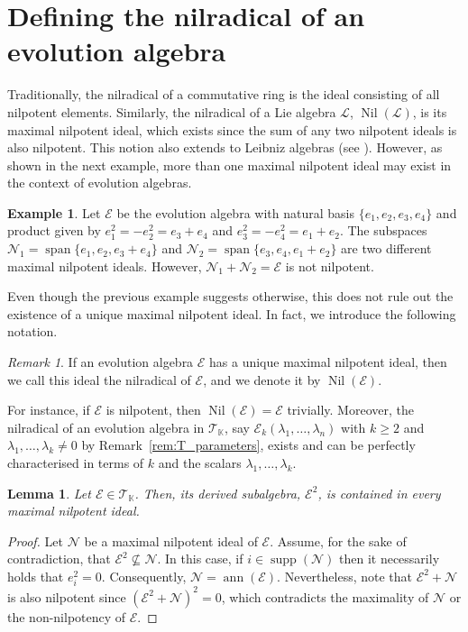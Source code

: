 \documentclass[12pt,reqno]{amsart}
\newtheorem{lemma}[theorem]{Lemma}
\theoremstyle{definition}
\newtheorem{example}[theorem]{Example}
\theoremstyle{remark}
\newtheorem{remark}[theorem]{Remark}
\DeclareMathOperator{\ann}{ann}
\DeclareMathOperator{\spa}{span}
\DeclareMathOperator{\supp}{supp}
\DeclareMathOperator{\nil}{Nil}
\numberwithin{equation}{section}
\begin{document}
\section{Defining the nilradical of an evolution algebra}\label{sec:3}

Traditionally, the nilradical of a commutative ring is the ideal consisting of all nilpotent elements. Similarly, the nilradical of a Lie algebra $\mathcal{L}$, $\nil(\mathcal{L})$, is its maximal nilpotent ideal, which exists since the sum of any two nilpotent ideals is also nilpotent. This notion also extends to Leibniz algebras (see \cite[Corollary 4]{bosko2011jacobson}). However, as shown in the next example, more than one maximal nilpotent ideal may exist in the context of evolution algebras.

\begin{example}\label{ex:1}
	Let $\mathcal{E}$ be the evolution algebra with natural basis $\{e_1,e_2,e_3,e_4\}$ and product given by $e_1^2=-e_2^2=e_3+e_4$ and $e_3^2=-e_4^2=e_1+e_2$. The subspaces $\mathcal{N}_1=\spa\{e_1,e_2,e_3+e_4\}$ and $\mathcal{N}_2=\spa\{e_3,e_4,e_1+e_2\}$ are two different maximal nilpotent ideals. However, $\mathcal{N}_1+\mathcal{N}_2=\mathcal{E}$ is not nilpotent.
\end{example}
Even though the previous example suggests otherwise, this does not rule out the existence of a unique maximal nilpotent ideal. In fact, we introduce the following notation.
\begin{remark} 
If an evolution algebra $\mathcal{E}$ has a unique maximal nilpotent ideal, then we call this ideal the nilradical of $\mathcal{E}$, and we denote it by $\nil(\mathcal{E})$.
\end{remark}
For instance, if $\mathcal{E}$ is nilpotent, then $\nil(\mathcal{E})=\mathcal{E}$ trivially. Moreover, the nilradical of an evolution algebra in $\mathcal{T}_\mathbb{K}$, say $\mathcal{E}_k(\lambda_1,\dots,\lambda_n)$ with $k\geq2$ and $\lambda_1,\dots,\lambda_k\neq0$ by Remark~\ref{rem:T_parameters}, exists and can be perfectly characterised in terms of $k$ and the scalars $\lambda_1,\dots,\lambda_k$.

\begin{lemma}\label{lem:lem1}
	Let $\mathcal{E}\in\mathcal{T}_\mathbb{K}$. Then, its derived subalgebra, $\mathcal{E}^2$, is contained in every maximal nilpotent ideal.
\end{lemma}

\begin{proof}
	Let $\mathcal{N}$ be a maximal nilpotent ideal of $\mathcal{E}$. Assume, for the sake of contradiction, that $\mathcal{E}^2\nsubseteq\mathcal{N}$. In this case, if $i\in\supp(\mathcal{N})$ then it necessarily holds that $e_i^2=0$. Consequently, $\mathcal{N}=\ann(\mathcal{E})$. Nevertheless, note that $\mathcal{E}^2+\mathcal{N}$ is also nilpotent since $(\mathcal{E}^2+\mathcal{N})^2=0$, which contradicts the maximality of $\mathcal{N}$ or the non-nilpotency of $\mathcal{E}$.	 
\end{proof}
\end{document}
